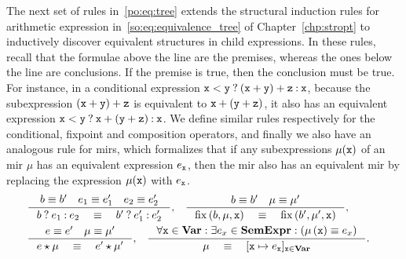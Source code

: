 The next set of rules in~\eqref{po:eq:tree} extends the structural induction
rules for arithmetic expression in~\eqref{so:eq:equivalence_tree} of
Chapter~\ref{chp:stropt} to inductively discover equivalent structures in child
expressions.  In these rules, recall that the formulae above the line are the
premises, whereas the ones below the line are conclusions.  If the premise
is true, then the conclusion must be true.  For instance, in a conditional
expression $\texttt{x} < \texttt{y}\mathbin{?}(\texttt{x} + \texttt{y}) + \texttt{z}\mathbin{:}\texttt{x}$, because
the subexpression $(\texttt{x} + \texttt{y}) + \texttt{z}$ is equivalent to $\texttt{x} + (\texttt{y}
+ \texttt{z})$, it also has an equivalent expression $\texttt{x} < \texttt{y}\mathbin{?}\texttt{x}
+ (\texttt{y} + \texttt{z})\mathbin{:}\texttt{x}$.  We define similar rules respectively for the
conditional, fixpoint and composition operators, and finally we also have an
analogous rule for \glspl{mir}, which formalizes that if any subexpressions
$\mu(\texttt{x})$ of an \gls{mir} $\mu$ has an equivalent expression $e_{\texttt{x}}$, then
the \gls{mir} also has an equivalent \gls{mir} by replacing the expression
$\mu(\texttt{x})$ with $e_{\texttt{x}}$.
\begin{equation}
    \begin{aligned}
    &
    \begin{aligned}
        \inference{%
            b \eqrel b^\prime \quad
            e_1 \eqrel e^\prime_1 \quad
            e_2 \eqrel e^\prime_2
        }{%
            \select{b}{e_1}{e_2} \quad \eqrel \quad
            \select{b^\prime}{e^\prime_1}{e^\prime_2}
        },
        & \quad
        \inference{%
            b \eqrel b^\prime \quad
            \mu \eqrel \mu^\prime
        }{%
            \fix\left(b, \mu, \varx\right) \quad \eqrel \quad
            \fix\left(b^\prime, \mu^\prime, \varx\right)
        },
    \end{aligned} \\
    &
    \begin{aligned}
        \inference{%
            e \eqrel e^\prime \quad
            \mu \eqrel \mu^\prime
        }{%
            e \expand \mu \quad \eqrel \quad e^\prime \expand \mu^\prime
        },
        & \quad
        \inference{%
            \forall \varx \in \varset:
            \exists e_x \in \sexprset:
            \left( \mu\left(\varx\right) \eqrel e_x \right)
        }{%
            \mu \quad \eqrel \quad [\varx \mapsto e_\varx]_{\varx \in \varset}
        }.
    \end{aligned}
    \end{aligned}
    \label{po:eq:tree}
\end{equation}


